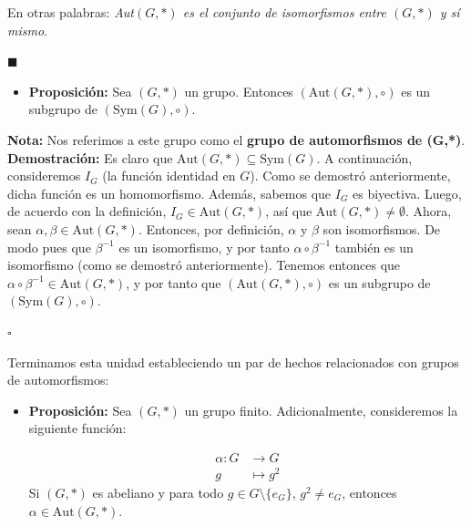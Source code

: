 \documentclass[10 pt]{article}
\begin{document}
\Large{En otras palabras: \textit{Aut$(G,*)$ es el conjunto de isomorfismos entre $(G,*)$ y sí mismo}.} \\

\begin{flushright}
    $\blacksquare$
\end{flushright}

\begin{itemize}
    \item \Large{\textbf{Proposición:} Sea $(G,*)$ un grupo. Entonces $(\text{Aut}(G,*),\circ)$ es un subgrupo de $(\text{Sym}(G),\circ)$.} \\
\end{itemize}

\Large{\textbf{Nota:} Nos referimos a este grupo como el \textbf{grupo de automorfismos de (G,*)}.} \\

\Large{\textbf{Demostración:} Es claro que $\text{Aut}(G,*) \subseteq \text{Sym}(G)$. A continuación, consideremos $I_G$ (la función identidad en $G$). Como se demostró anteriormente, dicha función es un homomorfismo. Además, sabemos que $I_G$ es biyectiva. Luego, de acuerdo con la definición, $I_G \in \text{Aut}(G,*)$, así que $\text{Aut}(G,*) \neq \emptyset$. Ahora, sean $\alpha,\beta \in \text{Aut}(G,*)$. Entonces, por definición, $\alpha$ y $\beta$ son isomorfismos. De modo pues que $\beta^{-1}$ es un isomorfismo, y por tanto $\alpha \circ \beta^{-1}$ también es un isomorfismo (como se demostró anteriormente). Tenemos entonces que $\alpha \circ \beta^{-1} \in \text{Aut}(G,*)$, y por tanto que $(\text{Aut}(G,*),\circ)$ es un subgrupo de $(\text{Sym}(G),\circ)$.} \\

\begin{flushright}
    $\square$
\end{flushright}

\Large{Terminamos esta unidad estableciendo un par de hechos relacionados con grupos de automorfismos:} \\

\begin{itemize}
    \item \Large{\textbf{Proposición:} Sea $(G,*)$ un grupo finito. Adicionalmente, consideremos la siguiente función:}
    
    \begin{align*}
        \alpha:G &\rightarrow G \\
        g &\mapsto g^2
    \end{align*}
    \Large{Si $(G,*)$ es abeliano y para todo $g \in G \setminus \{e_G\}$, $g^2 \neq e_G$, entonces $\alpha \in \text{Aut}(G,*)$.} \\
\end{itemize}
\end{document}
